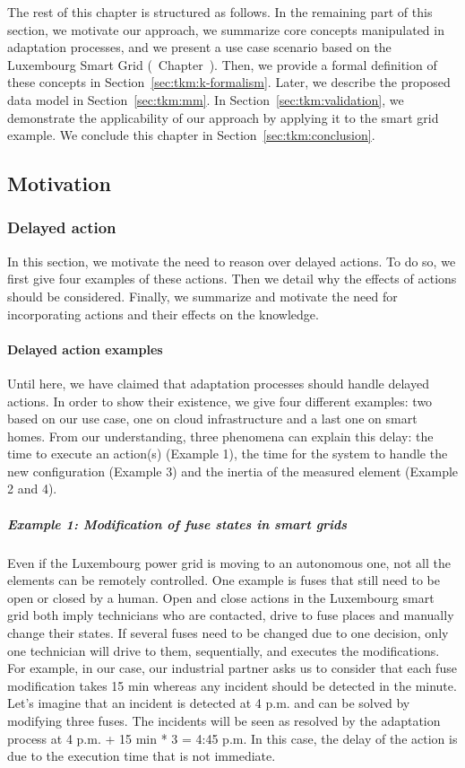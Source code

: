 The rest of this chapter is structured as follows.
In the remaining part of this section, we motivate our approach, we summarize core concepts manipulated in adaptation processes, and we present a use case scenario based on the Luxembourg Smart Grid (\cf~Chapter~).
Then, we provide a formal definition of these concepts in Section~\ref{sec:tkm:k-formalism}.
Later, we describe the proposed data model in Section~\ref{sec:tkm:mm}.
In Section~\ref{sec:tkm:validation}, we demonstrate the applicability of our approach by applying it to the smart grid example.
We conclude this chapter in Section~\ref{sec:tkm:conclusion}.

\subsection{Motivation}
\label{sec:tkm:intro:motiv}

\subsubsection{Delayed action}
\label{sec:tkm:intro:motiv:delayed_action}

In this section, we motivate the need to reason over delayed actions.
To do so, we first give four examples of these actions.
Then we detail why the effects of actions should be considered.
Finally, we summarize and motivate the need for incorporating actions and their effects on the knowledge. 

\paragraph{Delayed action examples}
Until here, we have claimed that adaptation processes should handle delayed actions.
In order to show their existence, we give four different examples: two based on our use case, one on cloud infrastructure and a last one on smart homes.
From our understanding, three phenomena can explain this delay: the time to execute an action(s) (Example 1), the time for the system to handle the new configuration (Example 3) and the inertia of the measured element (Example 2 and 4).

\subparagraph{Example 1: Modification of fuse states in smart grids}
Even if the Luxembourg power grid is moving to an autonomous one, not all the elements can be remotely controlled.
One example is fuses that still need to be open or closed by a human.
Open and close actions in the Luxembourg smart grid both imply technicians who are contacted, drive to fuse places and manually change their states.
If several fuses need to be changed due to one decision, only one technician will drive to them, sequentially, and executes the modifications.
For example, in our case, our industrial partner asks us to consider that each fuse modification takes 15 min whereas any incident should be detected in the minute.
Let's imagine that an incident is detected at 4 p.m. and can be solved by modifying three fuses.
The incidents will be seen as resolved by the adaptation process at 4 p.m. + 15 min * 3 = 4:45 p.m.
In this case, the delay of the action is due to the execution time that is not immediate.

